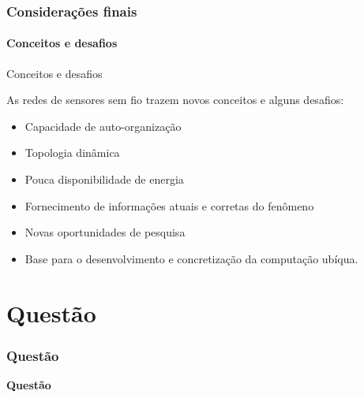 \documentclass[notes]{beamer}
\begin{document}
\begin{frame}
\label{slide_77}
\frametitle{Considerações finais}
\framesubtitle{Conceitos e desafios}

\begin{block}{Conceitos e desafios}

As redes de sensores sem fio trazem novos conceitos e alguns desafios: \pause

\begin{itemize}


\item Capacidade de auto-organização \pause
\item Topologia dinâmica \pause
\item Pouca disponibilidade de energia \pause
\item Fornecimento de informações atuais e corretas do fenômeno \pause

\end{itemize}

\end{block}

\begin{exampleblock} 

\begin{itemize}

\item Novas oportunidades de pesquisa \pause
\item Base para o desenvolvimento e concretização da computação ubíqua.

\end{itemize}

\end{exampleblock}

\end{frame}

\section{Questão}
\begin{frame}
\label{slide_078}
\frametitle{Questão}

\begin{block}

 \center \textbf{Questão}

\end{block}

\end{frame}
\end{document}
